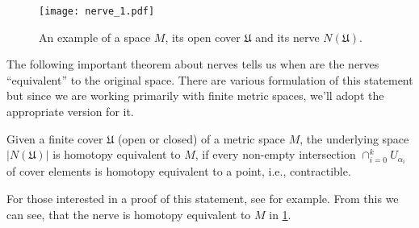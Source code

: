 \begin{figure}[h!]
  \centering
  \texttt{[image: nerve\_1.pdf]}
  \caption{An example of a space $M$, its open cover $\mathfrak{U}$ and its nerve $N(\mathfrak{U})$.}
  \label{fig:nerve_1}
\end{figure}

The following important theorem about nerves tells us when are the nerves ``equivalent'' to the original space. There are various formulation of this statement but since we are working primarily with finite metric spaces, we'll adopt the appropriate version for it.

\begin{theorem}
  Given a finite cover $\mathfrak{U}$ (open or closed) of a metric space $M$, the underlying space $|N(\mathfrak{U})|$ is homotopy equivalent to $M$, if every non-empty intersection $\cap_{i=0}^{k}U_{\alpha_{i}}$ of cover elements is homotopy equivalent to a point, i.e., contractible.
\end{theorem}

For those interested in a proof of this statement, see \cite{Borsuk1948OnTI} for example.
From this we can see, that the nerve is homotopy equivalent to $M$ in \ref{fig:nerve_1}.

